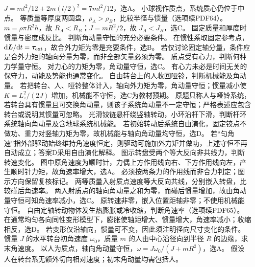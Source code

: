 \workings $J=ml^2/12+2m(l/2)^2=7ml^2/12$，选A。
\crosscheck 小球视作质点，系统质心仍位于中点。
\problemtext 等质量等厚度两圆盘，$\rho_A>\rho_B$，比较半径与惯量（选项续PDF64）。
\workings $m=\rho\pi R^2h$，故 $R_A<R_B$；$J=mR^2/2$，故 $J_A<J_B$，选C。
\crosscheck 固定质量和厚度时惯量与密度成反比。
\problemtext 判断角动量守恒的充分必要条件。
\workings 在惯性系取固定参考点，$\mathrm d\bm L/\mathrm dt=\bm\tau_{\rm ext}$，故合外力矩为零是充要条件，选B。
\crosscheck 若仅讨论固定轴分量，条件应是合外力矩的轴向分量为零，而非全部矢量必须为零。
\problemtext 质点受有心力，判断何种力学量守恒。
\workings 对力心的力矩为零，角动量守恒，选C。
\crosscheck 有心力未必是时间无关的保守力，动能及势能也通常变化。
\problemtext 自由转台上的人收回哑铃，判断机械能及角动量。
\workings 若把转台、人、哑铃整体计入，轴向外力矩为零，角动量守恒；惯量减小使 $K=L_z^2/(2J)$ 增加，机械能不守恒，选C为教材预期。
\crosscheck 原题只称人与哑铃系统，若转台具有惯量且可交换角动量，则该子系统角动量不一定守恒；严格表述应包含转台或说明其惯量可忽略。
\problemtext 光滑铰链悬杆绕竖轴转动，小环沿杆下滑，判断杆环系统轴向角动量及含地球系统机械能。
\workings 若初始转动后系统自由演化，固定铰点不做功、重力对竖轴力矩为零，故机械能与轴向角动量均守恒，选D。
\crosscheck 若“匀角速”指外部驱动始终维持角速度恒定，则驱动可施加外力矩并做功，上述守恒不再自动成立；答案D采用自由演化解释。
\problemtext 图示转盘受两个等大反向非共线力，判断转速变化。
\workings 图中原角速度为顺时针，力偶上方作用线向右、下方作用线向左，产生顺时针力矩，故角速率增大，选A。
\crosscheck 必须按两条力的作用线而非合力判定；图示方向保留复核标记。
\problemtext 两等质量入射质点速度等大反向共线，分别嵌入转盘，比较碰后角速率。
\workings 两入射质点的轴向角动量之和为零，而碰后惯量增加，故由角动量守恒可知角速率减小，选C。
\crosscheck 原转速非零，嵌入位置距轴非零；不使用机械能守恒。
\problemtext 自由定轴转动物体发生热膨胀或冷收缩，判断角速率（选项续PDF65）。
\workings 在通常均匀各向同性变形模型下，膨胀使轴距增大、惯量增大，角速率减小；收缩相反，选D。
\crosscheck 若变形仅沿轴向，惯量可不变，因此须注明径向尺寸变化的条件。
\problemtext 惯量 $J$ 的水平转台初角速度 $\omega_0$，质量 $m$ 的人由中心沿径向到半径 $R$ 的边缘，求末角速度。
\workings 以人为质点，轴向角动量守恒，$\omega=J\omega_0/(J+mR^2)$，选A。
\crosscheck 假设人在转台系无额外切向相对速度；初末角动量均需包括人。
